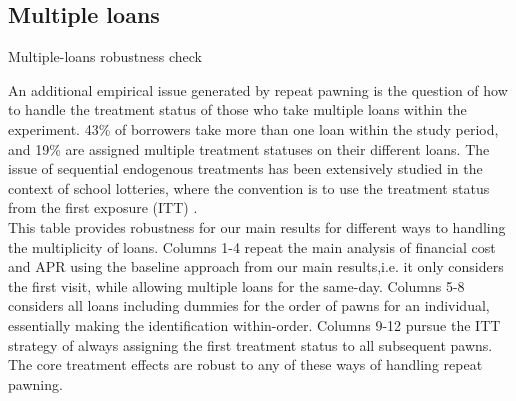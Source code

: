 \begin{landscape}
\subsection{Multiple loans}

\begin{table}[H]
\caption{Multiple-loans robustness check}
\label{multiple_loans}
\begin{center}
\scriptsize{}
\end{center}
 \scriptsize
 An additional empirical issue generated by repeat pawning is the question of how to handle the treatment status of those who take multiple loans within the experiment.  43\% of borrowers take more than one loan within the study period, and 19\% are assigned multiple treatment statuses on their different loans.  The issue of sequential endogenous treatments has been extensively studied in the context of school lotteries, where the convention is to use the treatment status from the first exposure (ITT) \citep{cullen2006effect, abdulkadirouglu2011accountability}.\\
 
 This table provides robustness for our main results for different ways to handling the multiplicity of loans. Columns 1-4 repeat the main analysis of financial cost and APR using the baseline approach from our main results,i.e. it only considers the first visit, while allowing multiple loans for the same-day. Columns 5-8 considers all loans including dummies for the order of pawns for an individual, essentially making the identification within-order.  Columns 9-12 pursue the ITT strategy of always assigning the first treatment status to all subsequent pawns. The core treatment effects are robust to any of these ways of handling repeat pawning.  
 
\end{table}


\end{landscape}


